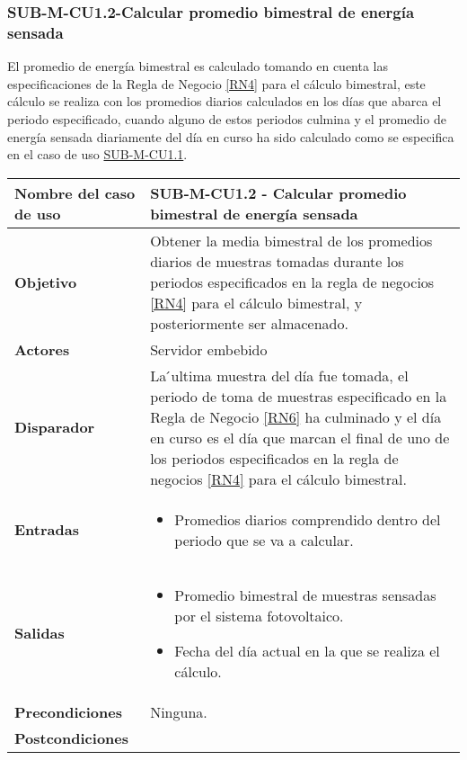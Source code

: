 \subsubsection{SUB-M-CU1.2-Calcular promedio bimestral de energía sensada }\label{SUB-M-CU1.2}
El  promedio  de  energía  bimestral es calculado  tomando en cuenta las especificaciones de la Regla de Negocio \ref{RN4} para el cálculo bimestral, este cálculo se realiza con los promedios diarios calculados en los días que abarca el periodo especificado, cuando alguno de estos
periodos culmina y el promedio de energía sensada diariamente del día en curso ha sido calculado como se especifica en el caso de uso \hyperref[SUB-M-CU1.1]{SUB-M-CU1.1}.


\begin{longtable}{|J{5cm}|J{10.3cm}|}
	\hline
	\textbf{Nombre del caso de uso} &
		SUB-M-CU1.2 - Calcular promedio bimestral de energía sensada
 \\ \hline
	\textbf{Objetivo} &
		Obtener la media bimestral de los promedios  diarios de muestras tomadas durante los periodos especificados en la regla de negocios  \ref{RN4} para el cálculo bimestral, y posteriormente ser almacenado.
 \\ \hline
	\textbf{Actores} &
		Servidor embebido \\ \hline 
	\textbf{Disparador} & 
		La ́ultima muestra del día fue tomada, el periodo de toma de muestras especificado en la Regla de Negocio \ref{RN6} ha culminado y el día en curso es el día que marcan el final de uno de los periodos especificados en la regla de negocios \ref{RN4} para el cálculo bimestral. \\ \hline 
	\textbf{Entradas} & 
		\begin{itemize}
				\item Promedios diarios comprendido dentro del periodo que se va a calcular.
		\end{itemize}\\ \hline 
	\textbf{Salidas} & 
		\begin{itemize}
			\item Promedio bimestral de muestras sensadas por el sistema fotovoltaico.
			\item Fecha del día actual en la que se realiza el cálculo.
		\end{itemize} \\ \hline
	\textbf{Precondiciones} &
		Ninguna.\\ \hline
	\textbf{Postcondiciones} &
		\begin{itemize}

\end{itemize}
\end{longtable}
